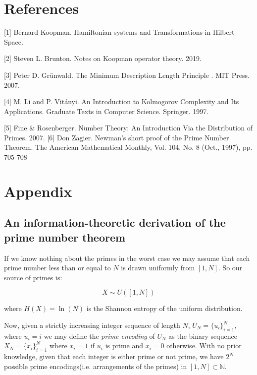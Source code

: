 \documentclass{article}
\begin{document}
\section*{References}

\small

[1] Bernard Koopman. Hamiltonian systems and Transformations in Hilbert Space.

[2] Steven L. Brunton. Notes on Koopman operator theory. 2019.

[3] Peter D. Grünwald. The Minimum Description Length Principle
. MIT Press. 2007.

[4] M. Li and P. Vitányi. An Introduction to Kolmogorov Complexity and Its Applications. Graduate Texts in Computer Science. Springer. 1997.

[5] Fine & Rosenberger. Number Theory: An Introduction Via the Distribution of Primes. 2007.
[6] Don Zagier. Newman’s short proof of the Prime Number Theorem. The American Mathematical Monthly, Vol. 104, No. 8 (Oct., 1997), pp. 705-708

\newpage

\section{Appendix}

\subsection{An information-theoretic derivation of the prime number theorem}

If we know nothing about the primes in the worst case we may assume that each prime number less than or equal to $N$ is drawn uniformly from $[1,N]$. So our source of primes is:

\begin{equation}
X \sim U([1,N]) \tag{1}
\end{equation}

where $H(X) = \ln(N)$ is the Shannon entropy of the uniform distribution.  

Now, given a strictly increasing integer sequence of length $N$, $U_N = \{u_i\}_{i=1}^N,$ where $u_i = i$ we may define the \textit{prime encoding} of $U_N$ as the binary sequence $X_N = \{x_i\}_{i=1}^N$ where $x_i =1$ if $u_i$ is prime and
$x_i=0$ otherwise. With no prior knowledge, given that each integer is either prime or not prime,
we have $2^N$ possible prime encodings(i.e. arrangements of the primes) in $[1,N] \subset \mathbb{N}$.
\end{document}
